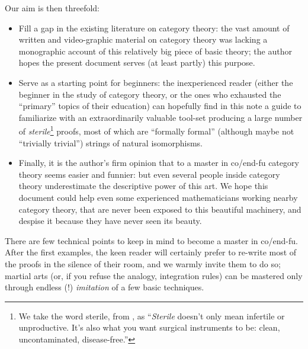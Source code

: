 Our aim is then threefold: 
\begin{itemize}
	\item Fill a gap in the existing literature on category theory: the vast amount of written and video-graphic material on category theory was lacking a monographic account of this relatively big piece of basic theory; the author hopes the present document serves (at least partly) this purpose. 
	\item Serve as a starting point for beginners: the inexperienced reader (either the beginner in the study of category theory, or the ones who exhausted the ``primary'' topics of their education) can hopefully find in this note a guide to familiarize with an extraordinarily valuable tool-set producing a large number of \emph{sterile}\footnote{We take the word sterile, from \cite{Leinster-cafe}, as ``\emph{Sterile} doesn't only mean infertile or unproductive. It's also what you want surgical instruments to be: clean, uncontaminated, disease-free.''} proofs, most of which are ``formally formal'' (although maybe not ``trivially trivial'') strings of natural isomorphisms.
	\item Finally, it is the author's firm opinion that to a master in co/end-fu category theory seems easier and funnier: but even several people inside category theory underestimate the descriptive power of this art. We hope this document could help even some experienced mathematicians working nearby category theory, that are never been exposed to this beautiful machinery, and despise it because they have never seen its beauty.
\end{itemize}
There are few technical points to keep in mind to become a master in co/end-fu. After the first examples, the keen reader will certainly prefer to re\hyp{}write most of the proofs in the silence of their room, and we warmly invite them to do so; martial arts (or, if you refuse the analogy, integration rules) can be mastered only through endless (!) \emph{imitation} of a few basic techniques.%
